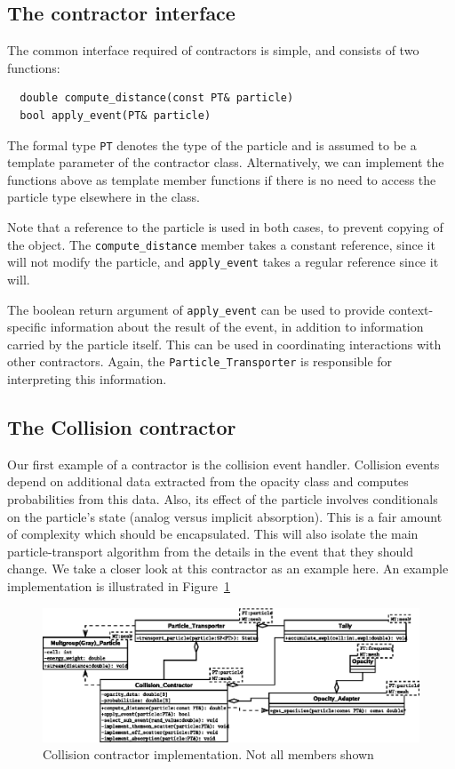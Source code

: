 \documentclass[memo]{ResearchNote}
\begin{document}
\subsection{The contractor interface}

The common interface required of contractors is simple, and consists
of two functions:
\begin{verbatim}
  double compute_distance(const PT& particle)
  bool apply_event(PT& particle)
\end{verbatim}

The formal type {\tt PT} denotes the type of the particle and is
assumed to be a template parameter of the contractor class.
Alternatively, we can implement the functions above as template member
functions if there is no need to access the particle type elsewhere in
the class.

Note that a reference to the particle is used in both cases, to
prevent copying of the object.  The {\tt compute\_distance} member
takes a constant reference, since it will not modify the particle, and
{\tt apply\_event} takes a regular reference since it will.

The boolean return argument of {\tt apply\_event} can be used to
provide context-specific information about the result of the event, in
addition to information carried by the particle itself. This can be
used in coordinating interactions with other contractors. Again, the
{\tt Particle\_Transporter} is responsible for interpreting this
information. 

\subsection{The Collision contractor}

Our first example of a contractor is the collision event handler.
Collision events depend on additional data extracted from the opacity
class and computes probabilities from this data. Also, its effect of
the particle involves conditionals on the particle's state (analog
versus implicit absorption). This is a fair amount of complexity which
should be encapsulated. This will also isolate the main
particle-transport algorithm from the details in the event that they
should change. We take a closer look at this contractor as an example
here. An example implementation is illustrated in
Figure~\ref{fig:collision_contractor}

\begin{center}
  \begin{figure}
    \includegraphics[width=6.5in]{figures/collision_contractor}
    \caption{Collision contractor implementation. Not all members shown} 
    \label{fig:collision_contractor}
  \end{figure}
\end{center}
\end{document}

